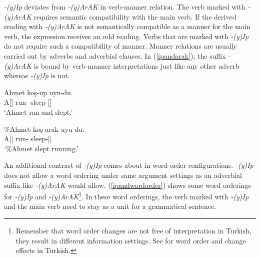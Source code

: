 \textit{-(y)Ip} deviates from \textit{-(y)ArAK} in verb-manner relation. The verb marked with \textit{-(y)ArAK} requires semantic compatibility with the main verb. If the derived reading with \textit{-(y)ArAK} is not semantically compatible as a manner for the main verb, the expression receives an odd reading. Verbs that are marked with \textit{-(y)Ip} do not require such a compatibility of manner. Manner relations are usually carried out by adverbs and adverbial clauses. In (\ref{ipandarak}), the suffix \textit{-(y)ArAK} is bound by verb-manner interpretations just like any other adverb whereas \textit{-(y)Ip} is not.

\begin{exe}
    \ex \label{ipandarak}
    \begin{xlist}
        \ex \label{ipandarak1} 
        \gll Ahmet koş-up uyu-du. \\
        A[{\Nom}] run-{\Pc} sleep-{\Pst}[{\Tsg}] \\
        \glt `Ahmet ran and slept.'
        
        \ex \label{ipandarak2} 
        \gll \%Ahmet koş-arak uyu-du. \\ 
        A[{\Nom}] run-{\By} sleep-{\Pst}[{\Tsg}] \\
        \glt `\%Ahmet slept running.'
    \end{xlist}
\end{exe}


An additional contrast of \textit{-(y)Ip} comes about in word order configurations. \textit{-(y)Ip} does not allow a word ordering under same argument settings as an adverbial suffix like \textit{-(y)ArAK} would allow. (\ref{ipandwordorder}) shows some word orderings for \textit{-(y)Ip} and \textit{-(y)ArAK}\footnote{Remember that word order changes are not free of interpretation in Turkish, they result in different information settings. See  \cite{ozturk2002turkish} for word order and change effects in Turkish.}. In these word orderings, the verb marked with \textit{-(y)Ip} and the main verb need to stay as a unit for a grammatical sentence.

